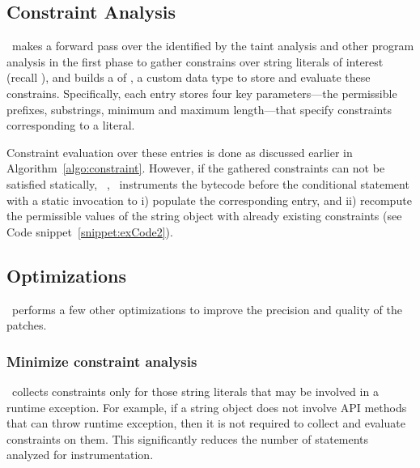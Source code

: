 \subsection{Constraint Analysis}
\label{subsec:constraint analysis}

\tool\ makes a forward pass over the  identified by the taint
analysis and other program analysis in the first phase to gather constrains over
string literals of interest (recall ), and builds a
 of , a custom data type to store and
evaluate these constrains. Specifically, each  entry
stores four key parameters---the permissible prefixes, substrings, minimum and
maximum length---that specify constraints corresponding to a 
literal.

Constraint evaluation over these  entries is done as
discussed earlier in Algorithm~\ref{algo:constraint}. However, if the gathered
constraints can not be satisfied statically, \eg\
, \tool\ instruments the bytecode before the
conditional statement with a static invocation to i) populate the corresponding
\code{ConstraintDataType} entry, and ii) recompute the permissible values of the
string object with already existing constraints (see Code
snippet~\ref{snippet:exCode2}).


\subsection{Optimizations}
\label{subsec:optimizations}

\tool\ performs a few other optimizations to improve the precision and quality
of the patches.

\subsubsection{Minimize constraint analysis}
\label{subsubsec:minimizeConstrintInstrumentation}

\tool\ collects constraints only for those string literals that may be involved
in a runtime exception. For example, if a string object does not involve API
methods that can throw runtime exception, then it is not required to collect and
evaluate constraints on them. This significantly reduces the number of
statements analyzed for instrumentation.
 
